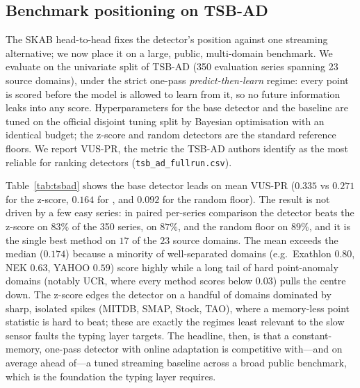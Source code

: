 \subsection{Benchmark positioning on TSB-AD}
\label{sec:tsbad}
The SKAB head-to-head fixes the detector's position against one streaming alternative; we now place it on a large, public, multi-domain benchmark. We evaluate on the univariate split of TSB-AD \citep{Liu2024TSBAD} (350 evaluation series spanning 23 source domains), under the strict one-pass \emph{predict-then-learn} regime: every point is scored before the model is allowed to learn from it, so no future information leaks into any score. Hyperparameters for the base detector and the \citet{Reunanen2020} baseline are tuned on the official disjoint tuning split by Bayesian optimisation with an identical budget; the z-score and random detectors are the standard reference floors. We report VUS-PR, the metric the TSB-AD authors identify as the most reliable for ranking detectors (\texttt{tsb\_ad\_fullrun.csv}).

Table~\ref{tab:tsbad} shows the base detector leads on mean VUS-PR ($0.335$ vs $0.271$ for the z-score, $0.164$ for \citet{Reunanen2020}, and $0.092$ for the random floor). The result is not driven by a few easy series: in paired per-series comparison the detector beats the z-score on $83\%$ of the 350 series, \citet{Reunanen2020} on $87\%$, and the random floor on $89\%$, and it is the single best method on $17$ of the $23$ source domains. The mean exceeds the median ($0.174$) because a minority of well-separated domains (e.g.\ Exathlon $0.80$, NEK $0.63$, YAHOO $0.59$) score highly while a long tail of hard point-anomaly domains (notably UCR, where every method scores below $0.03$) pulls the centre down. The z-score edges the detector on a handful of domains dominated by sharp, isolated spikes (MITDB, SMAP, Stock, TAO), where a memory-less point statistic is hard to beat; these are exactly the regimes least relevant to the slow sensor faults the typing layer targets. The headline, then, is that a constant-memory, one-pass detector with online adaptation is competitive with---and on average ahead of---a tuned streaming baseline across a broad public benchmark, which is the foundation the typing layer requires.

